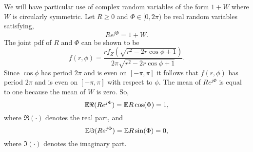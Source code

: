 \documentclass[journal]{IEEEtran}
\begin{document}
We will have particular use of complex random variables of the form $1 + W$ where $W$ is circularly symmetric.  Let $R \geq 0$ and $\Phi \in [0,2\pi)$ be real random variables satisfying, 
\[
R e^{j\Phi} = 1 + W.
\]
The joint pdf of $R$ and $\Phi$ can be shown to be
\begin{equation}\label{eq:pdfRPhi}
f(r,\phi) = \frac{r f_Z(\sqrt{r^2 - 2r\cos\phi + 1})}{2\pi\sqrt{r^2 - 2r\cos\phi + 1}}.
\end{equation}
Since $\cos\phi$ has period $2\pi$ and is even on $[-\pi,\pi]$ it follows that $f(r,\phi)$ has period $2\pi$ and is even on $[-\pi,\pi]$ with respect to $\phi$.  The mean of $R e^{j\Phi}$ is equal to one because the mean of $W$ is zero.  So,
\begin{equation}\label{eq:expectRepartRphi}
{\mathbb E} \Re(R e^{j\Phi}) = {\mathbb E} R \cos(\Phi) = 1,
\end{equation}
where $\Re(\cdot)$ denotes the real part, and
\begin{equation}\label{eq:expectImpartRphi}
{\mathbb E} \Im(R e^{j\Phi}) = {\mathbb E} R \sin(\Phi) = 0,
\end{equation}
where $\Im(\cdot)$ denotes the imaginary part.


\end{document}
